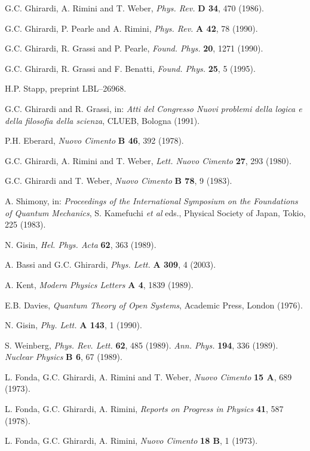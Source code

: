 \documentclass[12pt]{article}
\begin{document}
\begin{thebibliography}{999}
 G.C. Ghirardi, A. Rimini and T. Weber, {\it Phys.
Rev.} {\bf D 34}, 470 (1986).

 G.C. Ghirardi, P. Pearle and A. Rimini, {\it Phys.
Rev.} {\bf A 42}, 78 (1990).

 G.C. Ghirardi, R. Grassi and P. Pearle, {\it Found.
Phys.} {\bf 20}, 1271 (1990).

 G.C. Ghirardi, R. Grassi and F. Benatti, {\it Found.
Phys.} {\bf 25}, 5 (1995).

 H.P. Stapp, preprint LBL--26968.

 G.C. Ghirardi and R. Grassi, in: {\it Atti del
Congresso Nuovi problemi della logica e della filosofia della
scienza}, CLUEB, Bologna (1991).

 P.H. Eberard, {\it Nuovo Cimento} {\bf B 46}, 392
(1978).

 G.C. Ghirardi, A. Rimini and T. Weber, {\it Lett.
Nuovo Cimento} {\bf 27}, 293 (1980).

 G.C. Ghirardi and T. Weber, {\it Nuovo Cimento}
{\bf B 78}, 9 (1983).

 A. Shimony, in: {\it Proceedings of the
International Symposium on the Foundations of Quantum Mechanics},
S. Kamefuchi {\it et al} eds., Physical Society of Japan, Tokio,
225 (1983).

 N. Gisin, {\it Hel. Phys. Acta} {\bf 62}, 363
(1989).

 A. Bassi and G.C. Ghirardi, {\it Phys. Lett.} {\bf
A 309}, 4 (2003).

 A. Kent, {\it Modern Physics Letters} {\bf A 4},
1839 (1989).

 E.B. Davies, {\it Quantum Theory of Open Systems},
Academic Press, London (1976).

 N. Gisin, {\it Phy. Lett.} {\bf A 143}, 1 (1990).

 S. Weinberg, {\it Phys. Rev. Lett.} {\bf 62}, 485
(1989). {\it Ann. Phys.} {\bf 194}, 336 (1989). {\it Nuclear
Physics} {\bf B 6}, 67 (1989).

 L. Fonda, G.C. Ghirardi, A. Rimini and T. Weber,
{\it Nuovo Cimento} {\bf 15 A}, 689 (1973).

 L. Fonda, G.C. Ghirardi, A. Rimini, {\it Reports
on Progress in Physics} {\bf 41}, 587 (1978).

 L. Fonda, G.C. Ghirardi, A. Rimini, {\it Nuovo
Cimento} {\bf 18 B}, 1 (1973).


\end{thebibliography}
\end{document}
